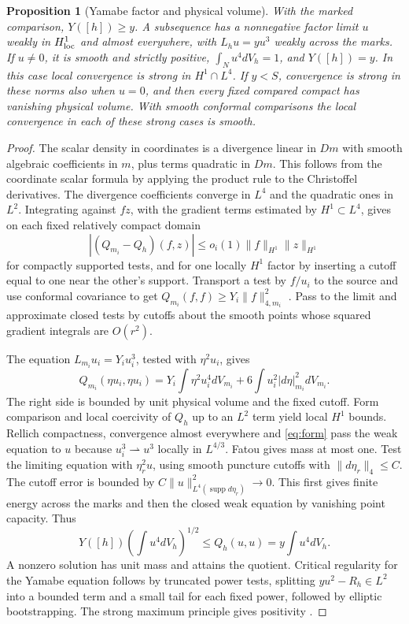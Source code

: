 \documentclass[11pt]{article}
\newtheorem{proposition}[theorem]{Proposition}
\theoremstyle{definition}
\theoremstyle{remark}
\begin{document}
\begin{proposition}[Yamabe factor and physical volume]\label{prop:factor}
With the marked comparison, \(Y([h])\ge y\). A subsequence has a nonnegative factor limit \(u\) weakly in \(H^1_{\rm loc}\) and almost everywhere, with \(L_hu=yu^3\) weakly across the marks. If \(u\ne0\), it is smooth and strictly positive, \(\int_Nu^4dV_h=1\), and \(Y([h])=y\). In this case local convergence is strong in \(H^1\cap L^4\). If \(y<S\), convergence is strong in these norms also when \(u=0\), and then every fixed compared compact has vanishing physical volume. With smooth conformal comparisons the local convergence in each of these strong cases is smooth.
\end{proposition}
\begin{proof}
The scalar density in coordinates is a divergence linear in \(Dm\) with smooth algebraic coefficients in \(m\), plus terms quadratic in \(Dm\). This follows from the coordinate scalar formula by applying the product rule to the Christoffel derivatives. The divergence coefficients converge in \(L^4\) and the quadratic ones in \(L^2\). Integrating against \(fz\), with the gradient terms estimated by \(H^1\subset L^4\), gives on each fixed relatively compact domain
\begin{equation}\label{eq:form}
 |(Q_{m_i}-Q_h)(f,z)|\le o_i(1)\|f\|_{H^1}\|z\|_{H^1}
\end{equation}
for compactly supported tests, and for one locally \(H^1\) factor by inserting a cutoff equal to one near the other's support. Transport a test by \(f/u_i\) to the source and use conformal covariance to get \(Q_{m_i}(f,f)\ge Y_i\|f\|_{4,m_i}^2\) \cite[\S2]{LeeParker1987Yamabe}. Pass to the limit and approximate closed tests by cutoffs about the smooth points whose squared gradient integrals are \(O(r^2)\).

The equation \(L_{m_i}u_i=Y_i u_i^3\), tested with \(\eta^2u_i\), gives
\[
 Q_{m_i}(\eta u_i,\eta u_i)=Y_i\int\eta^2 u_i^4dV_{m_i}+6\int u_i^2|d\eta|_{m_i}^2dV_{m_i}.
\]
The right side is bounded by unit physical volume and the fixed cutoff. Form comparison and local coercivity of \(Q_h\) up to an \(L^2\) term yield local \(H^1\) bounds. Rellich compactness, convergence almost everywhere and \eqref{eq:form} pass the weak equation to \(u\) because \(u_i^3\rightharpoonup u^3\) locally in \(L^{4/3}\). Fatou gives mass at most one. Test the limiting equation with \(\eta_r^2u\), using smooth puncture cutoffs with \(\|d\eta_r\|_4\le C\). The cutoff error is bounded by \(C\|u\|_{L^4(\operatorname{supp}d\eta_r)}^2\to0\). This first gives finite energy across the marks and then the closed weak equation by vanishing point capacity. Thus
\[
 Y([h])\left(\int u^4dV_h\right)^{1/2}
       \le Q_h(u,u)=y\int u^4dV_h .
\]
A nonzero solution has unit mass and attains the quotient. Critical regularity for the Yamabe equation follows by truncated power tests, splitting \(yu^2-R_h\in L^2\) into a bounded term and a small tail for each fixed power, followed by elliptic bootstrapping. The strong maximum principle gives positivity \cite[\S2 and after Theorem 4.1]{LeeParker1987Yamabe}.


\end{proof}
\end{document}
